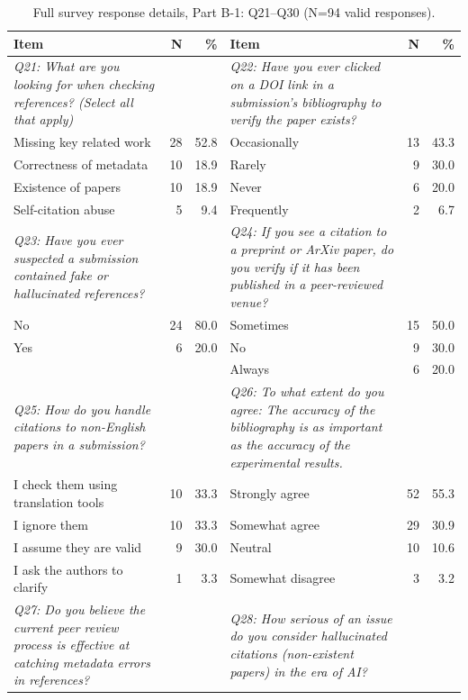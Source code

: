 \begin{table}[htbp]
  \centering
  \begin{threeparttable}
    \caption{Full survey response details, Part B-1: Q21--Q30 (N=94 valid responses).}
    \label{tab:survey_details_full_b1}
    \small
    \begin{tabular}{p{6cm}rr|p{6cm}rr}
\toprule
\textbf{Item} & \textbf{N} & \textbf{\%} & \textbf{Item} & \textbf{N} & \textbf{\%} \\
\midrule
\textit{Q21: What are you looking for when checking references? (Select all that apply)} & & & \textit{Q22: Have you ever clicked on a DOI link in a submission's bibliography to verify the paper exists?} & & \\
\rowcolor{tableRowLight}
Missing key related work & 28 & 52.8 & Occasionally & 13 & 43.3 \\
Correctness of metadata & 10 & 18.9 & Rarely & 9 & 30.0 \\
\rowcolor{tableRowLight}
Existence of papers & 10 & 18.9 & Never & 6 & 20.0 \\
Self-citation abuse & 5 & 9.4 & Frequently & 2 & 6.7 \\
\midrule
\textit{Q23: Have you ever suspected a submission contained fake or hallucinated references?} & & & \textit{Q24: If you see a citation to a preprint or ArXiv paper, do you verify if it has been published in a peer-reviewed venue?} & & \\
\rowcolor{tableRowLight}
No & 24 & 80.0 & Sometimes & 15 & 50.0 \\
Yes & 6 & 20.0 & No & 9 & 30.0 \\
\rowcolor{tableRowLight}
 &  &  & Always & 6 & 20.0 \\
\midrule
\textit{Q25: How do you handle citations to non-English papers in a submission?} & & & \textit{Q26: To what extent do you agree: The accuracy of the bibliography is as important as the accuracy of the experimental results.} & & \\
\rowcolor{tableRowLight}
I check them using translation tools & 10 & 33.3 & Strongly agree & 52 & 55.3 \\
I ignore them & 10 & 33.3 & Somewhat agree & 29 & 30.9 \\
\rowcolor{tableRowLight}
I assume they are valid & 9 & 30.0 & Neutral & 10 & 10.6 \\
I ask the authors to clarify & 1 & 3.3 & Somewhat disagree & 3 & 3.2 \\
\rowcolor{tableRowLight}
\midrule
\textit{Q27: Do you believe the current peer review process is effective at catching metadata errors in references?} & & & \textit{Q28: How serious of an issue do you consider hallucinated citations (non-existent papers) in the era of AI?} & & \\

\end{tabular}
\end{threeparttable}
\end{table}
